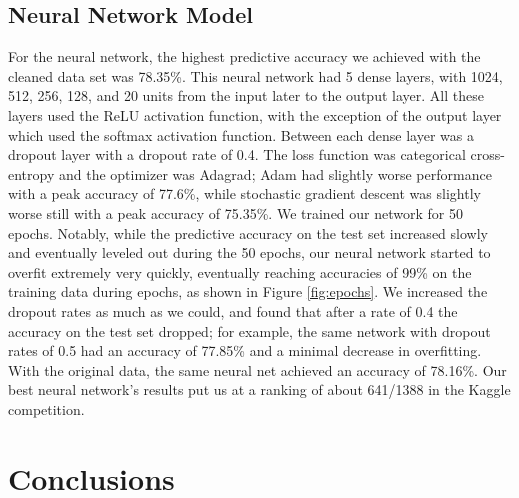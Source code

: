 \documentclass[11pt]{article}
\begin{document}
\subsection{Neural Network Model}
For the neural network, the highest predictive accuracy we achieved with the cleaned data set was 78.35\%. This neural network had 5 dense layers, with 1024, 512, 256, 128, and 20 units from the
input later to the output layer. All these layers used the ReLU activation function, with the exception of the output layer which used the softmax activation function.
Between each dense layer was a dropout layer with a dropout rate of 0.4. The loss function was categorical cross-entropy and the optimizer was Adagrad; Adam had slightly worse
performance with a peak accuracy of 77.6\%, while stochastic gradient descent was slightly worse still with a peak accuracy of 75.35\%. We trained our
network for 50 epochs. Notably, while the predictive accuracy on the test set increased slowly and eventually leveled out during the 50 epochs, our neural network
started to overfit extremely very quickly, eventually reaching accuracies of 99\% on the training data during epochs, as
shown in Figure \ref{fig:epochs}. We increased the dropout rates as much as we could, and found
that after a rate of 0.4 the accuracy on the test set dropped; for example, the same network with dropout rates of 0.5 had an accuracy of 77.85\% and a minimal decrease
in overfitting. With the original data, the same neural net achieved an accuracy of 78.16\%. Our best neural network's results put us at a ranking of about 641/1388 in the Kaggle competition.








\section{Conclusions}
\end{document}
